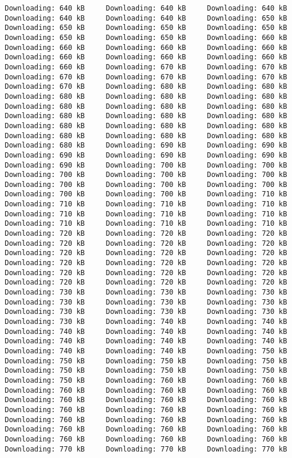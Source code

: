 \documentclass[
  12pt,
]{report}
\begin{document}
\begin{verbatim}
Downloading: 640 kB     Downloading: 640 kB     Downloading: 640 kB     Downloading: 640 kB     Downloading: 640 kB     Downloading: 650 kB     Downloading: 650 kB     Downloading: 650 kB     Downloading: 650 kB     Downloading: 650 kB     Downloading: 650 kB     Downloading: 660 kB     Downloading: 660 kB     Downloading: 660 kB     Downloading: 660 kB     Downloading: 660 kB     Downloading: 660 kB     Downloading: 660 kB     Downloading: 660 kB     Downloading: 670 kB     Downloading: 670 kB     Downloading: 670 kB     Downloading: 670 kB     Downloading: 670 kB     Downloading: 670 kB     Downloading: 680 kB     Downloading: 680 kB     Downloading: 680 kB     Downloading: 680 kB     Downloading: 680 kB     Downloading: 680 kB     Downloading: 680 kB     Downloading: 680 kB     Downloading: 680 kB     Downloading: 680 kB     Downloading: 680 kB     Downloading: 680 kB     Downloading: 680 kB     Downloading: 680 kB     Downloading: 680 kB     Downloading: 680 kB     Downloading: 680 kB     Downloading: 680 kB     Downloading: 690 kB     Downloading: 690 kB     Downloading: 690 kB     Downloading: 690 kB     Downloading: 690 kB     Downloading: 690 kB     Downloading: 700 kB     Downloading: 700 kB     Downloading: 700 kB     Downloading: 700 kB     Downloading: 700 kB     Downloading: 700 kB     Downloading: 700 kB     Downloading: 700 kB     Downloading: 700 kB     Downloading: 700 kB     Downloading: 710 kB     Downloading: 710 kB     Downloading: 710 kB     Downloading: 710 kB     Downloading: 710 kB     Downloading: 710 kB     Downloading: 710 kB     Downloading: 710 kB     Downloading: 710 kB     Downloading: 710 kB     Downloading: 720 kB     Downloading: 720 kB     Downloading: 720 kB     Downloading: 720 kB     Downloading: 720 kB     Downloading: 720 kB     Downloading: 720 kB     Downloading: 720 kB     Downloading: 720 kB     Downloading: 720 kB     Downloading: 720 kB     Downloading: 720 kB     Downloading: 720 kB     Downloading: 720 kB     Downloading: 720 kB     Downloading: 720 kB     Downloading: 720 kB     Downloading: 720 kB     Downloading: 730 kB     Downloading: 730 kB     Downloading: 730 kB     Downloading: 730 kB     Downloading: 730 kB     Downloading: 730 kB     Downloading: 730 kB     Downloading: 730 kB     Downloading: 730 kB     Downloading: 730 kB     Downloading: 740 kB     Downloading: 740 kB     Downloading: 740 kB     Downloading: 740 kB     Downloading: 740 kB     Downloading: 740 kB     Downloading: 740 kB     Downloading: 740 kB     Downloading: 740 kB     Downloading: 740 kB     Downloading: 750 kB     Downloading: 750 kB     Downloading: 750 kB     Downloading: 750 kB     Downloading: 750 kB     Downloading: 750 kB     Downloading: 750 kB     Downloading: 750 kB     Downloading: 760 kB     Downloading: 760 kB     Downloading: 760 kB     Downloading: 760 kB     Downloading: 760 kB     Downloading: 760 kB     Downloading: 760 kB     Downloading: 760 kB     Downloading: 760 kB     Downloading: 760 kB     Downloading: 760 kB     Downloading: 760 kB     Downloading: 760 kB     Downloading: 760 kB     Downloading: 760 kB     Downloading: 760 kB     Downloading: 760 kB     Downloading: 760 kB     Downloading: 760 kB     Downloading: 760 kB     Downloading: 770 kB     Downloading: 770 kB     Downloading: 770 kB     
\end{verbatim}
\end{document}
